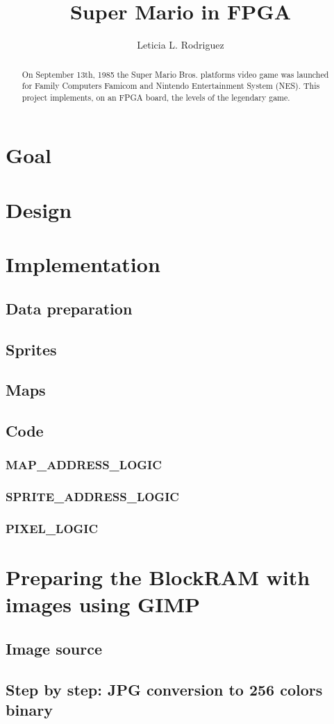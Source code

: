 \documentclass[a4paper,11pt]{article}
\title{Super Mario in FPGA}
\author{Leticia L. Rodriguez}
\begin{document}
\maketitle
\tableofcontents
\newpage
\begin{abstract}
On September 13th, 1985 the Super Mario Bros. platforms video game was launched for Family Computers Famicom and Nintendo Entertainment System (NES). This project implements, on an FPGA board, the levels of the legendary game.
\end{abstract}

\section{Goal}
\section{Design}
\section{Implementation}
\subsection{Data preparation}
\subsection{Sprites}
\subsection{Maps}
\subsection{Code}
\subsubsection{MAP\_ADDRESS\_LOGIC}
\subsubsection{SPRITE\_ADDRESS\_LOGIC}
\subsubsection{PIXEL\_LOGIC}
\appendix
\section{Preparing the BlockRAM with images using GIMP}
\subsection{Image source}
\subsection{Step by step: JPG conversion to 256 colors binary}
\end{document}
